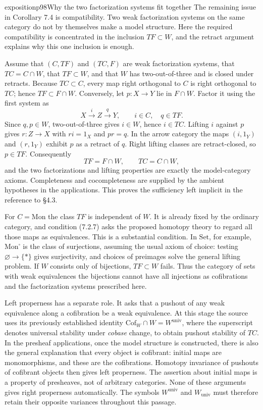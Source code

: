 \begin{itemize}[leftmargin=*]
\begin{dcomment}{exposition}{p98}{Why the two factorization systems fit together}
The remaining issue in Corollary 7.4 is compatibility. Two weak factorization systems on the same category do not by themselves make a model structure. Here the required compatibility is concentrated in the inclusion $TF\subset W$, and the retract argument explains why this one inclusion is enough.

Assume that $(C,TF)$ and $(TC,F)$ are weak factorization systems, that $TC=C\cap W$, that $TF\subset W$, and that $W$ has two-out-of-three and is closed under retracts. Because $TC\subset C$, every map right orthogonal to $C$ is right orthogonal to $TC$; hence $TF\subset F\cap W$. Conversely, let $p:X\to Y$ lie in $F\cap W$. Factor it using the first system as
\[
 X\xrightarrow{i}Z\xrightarrow{q}Y,
 \qquad i\in C,\quad q\in TF.
\]
Since $q,p\in W$, two-out-of-three gives $i\in W$, hence $i\in TC$. Lifting $i$ against $p$ gives $r:Z\to X$ with $ri=1_X$ and $pr=q$. In the arrow category the maps $(i,1_Y)$ and $(r,1_Y)$ exhibit $p$ as a retract of $q$. Right lifting classes are retract-closed, so $p\in TF$. Consequently
\[
 TF=F\cap W,\qquad TC=C\cap W,
\]
and the two factorizations and lifting properties are exactly the model-category axioms. Completeness and cocompleteness are supplied by the ambient hypotheses in the applications. This proves the sufficiency left implicit in the reference to \S4.3.

For $C=\mathrm{Mon}$ the class $TF$ is independent of $W$. It is already fixed by the ordinary category, and condition (7.2.7) asks the proposed homotopy theory to regard all those maps as equivalences. This is a substantial condition. In $\mathrm{Set}$, for example, $\mathrm{Mon}^{\square}$ is the class of surjections, assuming the usual axiom of choice: testing $\varnothing\to\{*\}$ gives surjectivity, and choices of preimages solve the general lifting problem. If $W$ consists only of bijections, $TF\subset W$ fails. Thus the category of sets with weak equivalences the bijections cannot have all injections as cofibrations and the factorization systems prescribed here.

Left properness has a separate role. It asks that a pushout of any weak equivalence along a cofibration be a weak equivalence. At this stage the source uses its previously established identity $\mathrm{Cof}_W\cap W=W^{\mathrm{univ}}$, where the superscript denotes universal stability under \emph{cobase} change, to obtain pushout stability of $TC$. In the presheaf applications, once the model structure is constructed, there is also the general explanation that every object is cofibrant: initial maps are monomorphisms, and these are the cofibrations. Homotopy invariance of pushouts of cofibrant objects then gives left properness. The assertion about initial maps is a property of presheaves, not of arbitrary categories. None of these arguments gives right properness automatically. The symbols $W^{\mathrm{univ}}$ and $W_{\mathrm{univ}}$ must therefore retain their opposite variances throughout this passage.
\end{dcomment}



\end{itemize}
